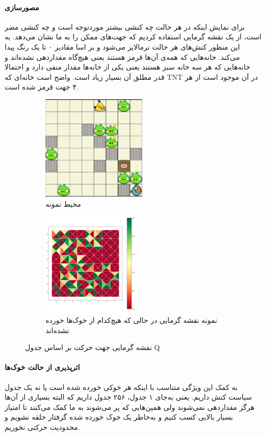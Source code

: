 \documentclass[11pt, a4paper, oneside]{report}
\begin{document}
		\paragraph{مصورسازی}
	برای نمایش اینکه در هر حالت چه کنشی بیشتر موردتوجه است و چه کنشی مضر است، از یک نقشه گرمایی استفاده کردیم که جهت‌های ممکن را به ما نشان می‌دهد. به این منظور کنش‌های هر حالت نرمالایز می‌شود و بر اسا مقادیر ۰ تا یک رنگ پیدا می‌کند. خانه‌هایی که همه‌ی آن‌ها قرمز هستند یعنی هیچ‌گاه مقداردهی نشده‌اند و خانه‌هایی که هر سه خانه سبز هستند یعنی یکی از خانه‌ها مقدار منفی دارد و احتمالا قدر مطلق آن بسیار زیاد است. واضح است خانه‌ای که TNT در آن موجود است از هر ۴ جهت قرمز شده است.
		\begin{center}
		\begin{figure}[H]
			\begin{subfigure}{5cm}
				\includegraphics[width=5cm]{./images/env2.png}
				\caption{محیط نمونه}
				\label{fig:g}
			\end{subfigure}
			\hfill
			\begin{subfigure}{5cm}
				\includegraphics[width=5cm]{./images/htmp.png}
				\caption{نمونه نقشه گرمایی در حالی که هیچ‌کدام از خوک‌ها خورده نشده‌اند}
				\label{fig:h}
			\end{subfigure}
			
			\caption{نقشه گرمایی جهت حرکت بر اساس جدول Q}
			\label{Heatmap}
			
		\end{figure}
	\end{center}
	
	\paragraph{اثرپذیری از حالت خوک‌ها}
	به کمک این ویژگی متناسب با اینکه هر خوکی خورده شده است یا نه یک جدول سیاست کنش داریم. یعنی به‌جای ۱ جدول، ۲۵۶ جدول داریم که البته بسیاری از آن‌ها هرگز مقداردهی نمی‌شوند ولی همین‌هایی که پر می‌شوند به ما کمک می‌کنند تا امتیاز بسیار بالایی کسب کنیم و به‌خاطر یک خوک خورده شده گرفتار حلقه نشویم و محدودیت حرکتی نخوریم.
	
\end{document}
